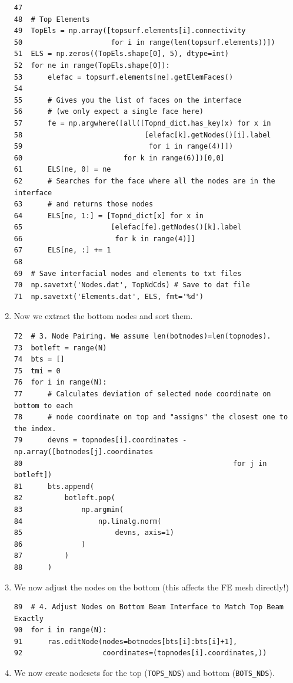 \documentclass[11pt]{article}
\begin{document}
\begin{enumerate}
\begin{verbatim}
47  
48  # Top Elements
49  TopEls = np.array([topsurf.elements[i].connectivity
50                     for i in range(len(topsurf.elements))])
51  ELS = np.zeros((TopEls.shape[0], 5), dtype=int)
52  for ne in range(TopEls.shape[0]):
53      elefac = topsurf.elements[ne].getElemFaces()
54  
55      # Gives you the list of faces on the interface
56      # (we only expect a single face here)
57      fe = np.argwhere([all([Topnd_dict.has_key(x) for x in 
58                             [elefac[k].getNodes()[i].label
59                              for i in range(4)]])
60                        for k in range(6)])[0,0]
61      ELS[ne, 0] = ne
62      # Searches for the face where all the nodes are in the interface
63      # and returns those nodes
64      ELS[ne, 1:] = [Topnd_dict[x] for x in
65                     [elefac[fe].getNodes()[k].label
66                      for k in range(4)]]
67      ELS[ne, :] += 1
68  
69  # Save interfacial nodes and elements to txt files
70  np.savetxt('Nodes.dat', TopNdCds) # Save to dat file
71  np.savetxt('Elements.dat', ELS, fmt='%d')
\end{verbatim}
\item Now we extract the bottom nodes and sort them.
\begin{verbatim}
72  # 3. Node Pairing. We assume len(botnodes)=len(topnodes).
73  botleft = range(N)
74  bts = []
75  tmi = 0
76  for i in range(N):
77      # Calculates deviation of selected node coordinate on bottom to each
78      # node coordinate on top and "assigns" the closest one to the index.
79      devns = topnodes[i].coordinates - np.array([botnodes[j].coordinates
80                                                  for j in botleft])
81      bts.append(
82          botleft.pop(
83              np.argmin(
84                  np.linalg.norm(
85                      devns, axis=1)
86              )
87          )
88      )
\end{verbatim}
\item We now adjust the nodes on the bottom (this affects the FE mesh directly!)
\begin{verbatim}
89  # 4. Adjust Nodes on Bottom Beam Interface to Match Top Beam Exactly
90  for i in range(N):
91      ras.editNode(nodes=botnodes[bts[i]:bts[i]+1],
92                   coordinates=(topnodes[i].coordinates,))
\end{verbatim}
\item We now create nodesets for the top (\texttt{TOPS\_NDS}) and bottom (\texttt{BOTS\_NDS}).
\begin{verbatim}

\end{verbatim}
\end{enumerate}
\end{document}
